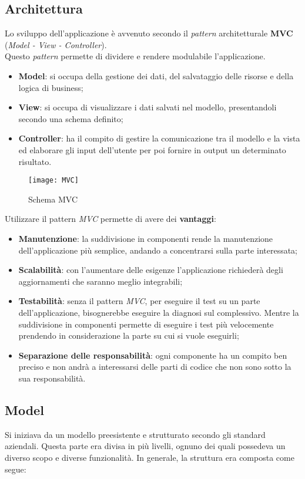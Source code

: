 \newpage
\subsection{Architettura}
Lo sviluppo dell'applicazione è avvenuto secondo il \textit{pattern} architetturale \textbf{MVC \glsfirstoccur} (\textit{Model - View - Controller}). \\
Questo \textit{pattern} permette di dividere e rendere modulabile l'applicazione.
\begin{itemize}
\item \textbf{Model}: si occupa della gestione dei dati, del salvataggio delle risorse e della logica di business;
\item \textbf{View}: si occupa di visualizzare i dati salvati nel modello, presentandoli secondo una schema definito;
\item \textbf{Controller}: ha il compito di gestire la comunicazione tra il modello e la vista ed elaborare gli input dell'utente per poi fornire in output un determinato risultato.
\end{itemize}

\begin{figure}[H]
    \centering 
    \texttt{[image: MVC]} 
    \bigskip
    \caption{Schema MVC}
\end{figure}

\noindent
Utilizzare il pattern \textit{MVC} permette di avere dei \textbf{vantaggi}:
\begin{itemize}
\item \textbf{Manutenzione}: la suddivisione in componenti rende la manutenzione dell'applicazione più semplice, andando a concentrarsi sulla parte interessata;
\item \textbf{Scalabilità}: con l'aumentare delle esigenze l'applicazione richiederà degli aggiornamenti che saranno meglio integrabili;
\item \textbf{Testabilità}: senza il pattern \textit{MVC}, per eseguire il test su un parte dell'applicazione, bisognerebbe eseguire la diagnosi sul complessivo. Mentre la suddivisione in componenti permette di eseguire i test più velocemente prendendo in considerazione la parte su cui si vuole eseguirli;
\item \textbf{Separazione delle responsabilità}: ogni componente ha un compito ben preciso e non andrà a interessarsi delle parti di codice che non sono sotto la sua responsabilità.
\end{itemize}

\subsection*{Model}
Si iniziava da un modello preesistente e strutturato secondo gli standard aziendali. Questa parte era divisa in più livelli, ognuno dei quali possedeva un diverso scopo e diverse funzionalità. In generale, la struttura era composta come segue: 

